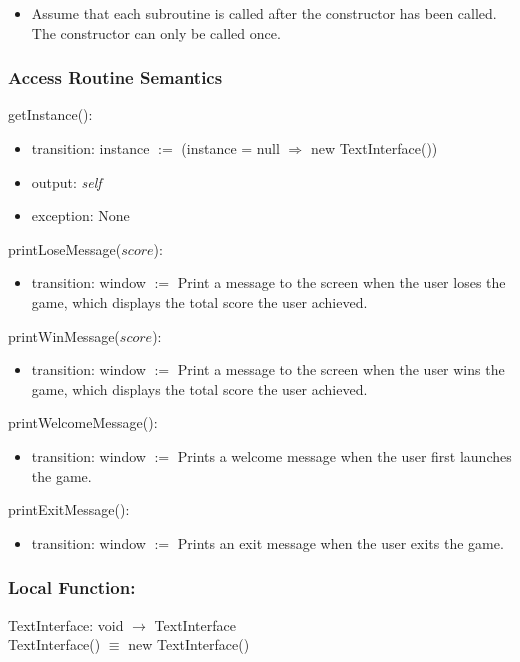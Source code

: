 \documentclass[12pt]{article}
\begin{document}
\begin{itemize}
\item Assume that each subroutine is called after the constructor has been called. The constructor can only be called once.
\end{itemize}

\subsubsection* {Access Routine Semantics}

\noindent getInstance():
\begin{itemize}
  \item transition: instance $:=$ (instance = null $\Rightarrow$ new TextInterface())
  \item output: \textit{self}
  \item exception: None
\end{itemize}

\noindent printLoseMessage($score$):
\begin{itemize}
\item transition: window $:=$ Print a message to the screen when the user loses the game, which displays the total score the user achieved. 
\end{itemize}

\noindent printWinMessage($score$):
\begin{itemize}
\item transition: window $:=$ Print a message to the screen when the user wins the game, which displays the total score the user achieved.
\end{itemize}

\noindent printWelcomeMessage():
\begin{itemize}
\item transition: window $:=$ Prints a welcome message when the user first launches the game.
\end{itemize}

\noindent printExitMessage():
\begin{itemize}
\item transition: window $:=$ Prints an exit message when the user exits the game.
\end{itemize}

\subsubsection*{Local Function:}

TextInterface: void $\rightarrow$ TextInterface \\
TextInterface() $\equiv$ new TextInterface()
\end{document}
